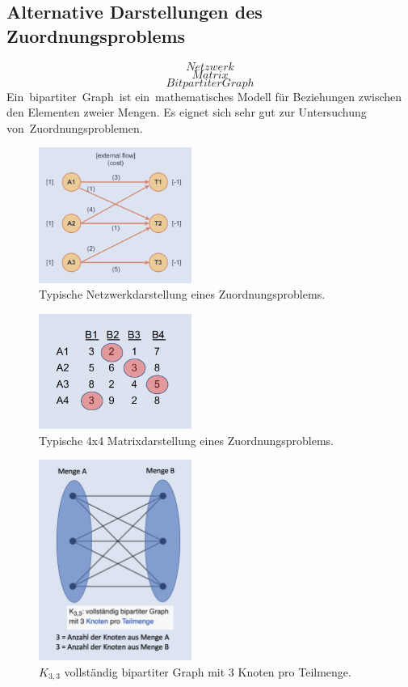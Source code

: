 \subsection{Alternative Darstellungen des Zuordnungsproblems
\label{munkres:subsection:bonorum}}
\begin{equation}
Netzwerk
\end{equation}
\begin{equation}
Matrix
\end{equation}
\begin{equation}
Bitpartiter Graph
\end{equation}
Ein bipartiter Graph ist ein mathematisches Modell für Beziehungen
zwischen den Elementen zweier Mengen.
Es eignet sich sehr gut zur Untersuchung von Zuordnungsproblemen. 
\begin{figure}
\centering
\includegraphics[width=5cm]{papers/munkres/figures/Netzwerkdarstellung}
\caption{Typische Netzwerkdarstellung eines Zuordnungsproblems.}
\label{munkres:Vr2}
\end{figure}

\begin{figure}
\centering
\includegraphics[width=5cm]{papers/munkres/figures/Matrixdarstellung}
\caption{Typische 4x4 Matrixdarstellung eines Zuordnungsproblems.}
\label{munkres:Vr2}
\end{figure}

\begin{figure}
\centering
\includegraphics[width=5cm]{papers/munkres/figures/bipartiter_graph}
\caption{$K_{3,3}$ vollständig bipartiter Graph mit 3 Knoten pro Teilmenge.}
\label{munkres:Vr2}
\end{figure}
